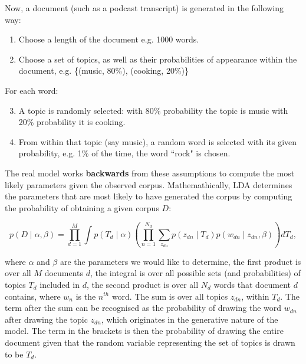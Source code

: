     Now, a document (such as a podcast transcript) is generated in the following way:
     
    \begin{enumerate}
        \item Choose a length of the document e.g. 1000 words.
        \item Choose a set of topics, as well as their probabilities of appearance within the document, e.g. \{(music, 80\%), (cooking, 20\%)\}
    \end{enumerate}
    
    For each word:
    \begin{enumerate}[leftmargin=6em]
    \setcounter{enumi}{2}
        \item A topic is randomly selected: with 80\% probability the topic is music with 20\% probability it is cooking.
        \item From within that topic (say music), a random word is selected with its given probability, e.g. 1\% of the time, the word ``rock" is chosen.
    \end{enumerate}
    
    The real model works \textbf{backwards} from these assumptions to compute the most likely parameters given the observed corpus.
    Mathemathically, LDA determines the parameters that are most likely to have generated the corpus by computing the probability of obtaining a given corpus $D$:
    
    \begin{equation}
        p(D \mid \alpha, \beta)=\prod_{d=1}^{M} \int p\left(T_{d} \mid \alpha\right)\left(\prod_{n=1}^{N_{d}} \sum_{z_{d n}} p\left(z_{d n} \mid T_{d}\right) p\left(w_{d n} \mid z_{d n}, \beta\right)\right) d T_{d},
    \end{equation}
    
    where $\alpha$ and $\beta$ are the parameters we would like to determine,
    the first product is over all $M$ documents $d$,
    the integral is over all possible sets (and probabilities) of topics $T_d$ included in $d$, 
    the second product is over all $N_d$ words that document $d$ contains, where $w_n$ is the $n^{th}$ word.
    The sum is over all topics $z_{dn}$, within $T_d$.
    The term after the sum can be recognised as the probability of drawing the word $w_{dn}$ after drawing the topic $z_{dn}$, which originates in the generative nature of the model.
    The term in the brackets is then the probability of drawing the entire document given that the random variable representing the set of topics is drawn to be $T_d$.
    

